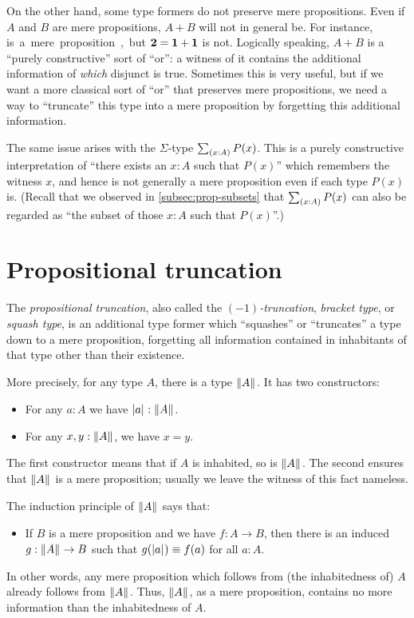 On the other hand, some type formers do not preserve mere propositions.
Even if $A$ and $B$ are mere propositions, $A+B$ will not in general be.
For instance, \unit is a mere proposition, but $\mathbf{2}=\mathbf{1}+\mathbf{1}$ is not.
Logically speaking, $A+B$ is a ``purely constructive'' sort of ``or'': a witness of it contains the additional information of \emph{which} disjunct is true.
Sometimes this is very useful, but if we want a more classical sort of ``or'' that preserves mere propositions, we need a way to ``truncate'' this type into a mere proposition by forgetting this additional information.

The same issue arises with the $\Sigma$-type $\sm{x:A} P(x)$.
This is a purely constructive interpretation of ``there exists an $x:A$ such that $P(x)$'' which remembers the witness $x$, and hence is not generally a mere proposition even if each type $P(x)$ is.
(Recall that we observed in \autoref{subsec:prop-subsets} that $\sm{x:A} P(x)$ can also be regarded as ``the subset of those $x:A$ such that $P(x)$''.)


\section{Propositional truncation}
\label{subsec:prop-trunc}

The \emph{propositional truncation}, also called the \emph{$(-1)$-truncation}, \emph{bracket type}, or \emph{squash type}, is an additional type former which ``squashes'' or ``truncates'' a type down to a mere proposition, forgetting all information contained in inhabitants of that type other than their existence.

More precisely, for any type $A$, there is a type $\mathopen{}\left\Vert A\right\Vert_{}\mathclose{}$.
It has two constructors:
\begin{itemize}
\item For any $a:A$ we have $\mathopen{}\left|a\right|_{}^{}\mathclose{} : \mathopen{}\left\Vert A\right\Vert_{}\mathclose{}$.
\item For any $x,y:\mathopen{}\left\Vert A\right\Vert_{}\mathclose{}$, we have $x=y$.
\end{itemize}
The first constructor means that if $A$ is inhabited, so is $\mathopen{}\left\Vert A\right\Vert_{}\mathclose{}$.
The second ensures that $\mathopen{}\left\Vert A\right\Vert_{}\mathclose{}$ is a mere proposition; usually we leave the witness of this fact nameless.

The induction principle of $\mathopen{}\left\Vert A\right\Vert_{}\mathclose{}$ says that:
\begin{itemize}
\item If $B$ is a mere proposition and we have $f:A\to B$, then there is an induced $g:\mathopen{}\left\Vert A\right\Vert_{}\mathclose{} \to B$ such that $g(\mathopen{}\left|a\right|_{}^{}\mathclose{}) \equiv f(a)$ for all $a:A$.
\end{itemize}
In other words, any mere proposition which follows from (the inhabitedness of) $A$ already follows from $\mathopen{}\left\Vert A\right\Vert_{}\mathclose{}$.
Thus, $\mathopen{}\left\Vert A\right\Vert_{}\mathclose{}$, as a mere proposition, contains no more information than the inhabitedness of $A$.

